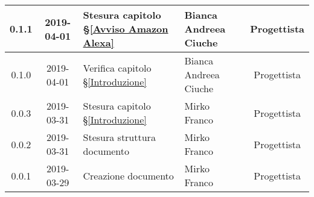 \begin{center}
\begin{tabularx}{\textwidth}{|c|c|X|X|c|}
			\hline
			0.1.1 & 2019-04-01 &Stesura capitolo \S\ref{Avviso Amazon Alexa} & Bianca Andreea Ciuche & Progettista \\
			\hline
			0.1.0 & 2019-04-01 & Verifica capitolo \S\ref{Introduzione} & Bianca Andreea Ciuche & Progettista \\
			\hline
			0.0.3 & 2019-03-31 & Stesura capitolo \S\ref{Introduzione} & Mirko Franco &  Progettista\\
			\hline
			0.0.2 & 2019-03-31 & Stesura struttura documento & Mirko Franco &  Progettista\\
			\hline
			0.0.1 & 2019-03-29 & Creazione documento & Mirko Franco & Progettista\\
			\hline
		\end{tabularx}
	\end{center}
\newpage